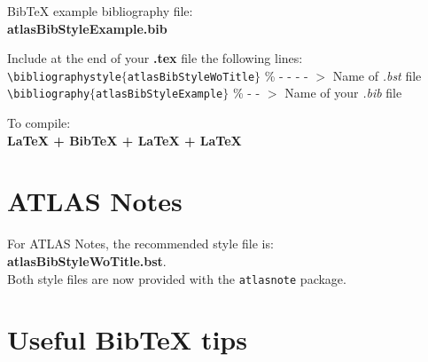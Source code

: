 \documentclass{../../style/atlasdoc}
\begin{document}
\bigskip
\noindent BibTeX example bibliography file: \\
\indent \textbf{atlasBibStyleExample.bib}

\bigskip
\noindent Include at the end of your \textbf{.tex} file the following lines: \\
\indent \texttt{\textbackslash bibliographystyle$\{$atlasBibStyleWoTitle$\}$}  \% - - - - $>$ Name of \emph{.bst} file \\
\indent \texttt{\textbackslash bibliography$\{$atlasBibStyleExample$\}$}  \% - - $>$ Name of your \emph{.bib} file

\bigskip
\noindent To compile: \\
\indent \textbf{LaTeX + BibTeX + LaTeX + LaTeX} 


\section{ATLAS Notes}

For ATLAS Notes, the recommended style file is: \\
\indent \textbf{atlasBibStyleWoTitle.bst}.\\

\noindent Both style files are now provided with the \texttt{atlasnote} package.


\section{Useful BibTeX tips}
\end{document}
